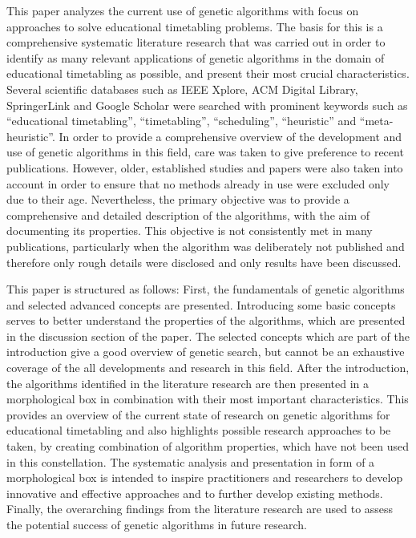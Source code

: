 \documentclass[sigconf]{acmart}
\begin{document}
This paper analyzes the current use of genetic algorithms with focus on
approaches to solve educational timetabling problems.
%
The basis for this is a comprehensive systematic literature research that
was carried out in order to identify as many relevant applications of genetic
algorithms in the domain of educational timetabling as possible, and
present their most crucial characteristics.
%
Several scientific databases such as IEEE Xplore, ACM Digital Library,
SpringerLink and Google Scholar were searched with prominent keywords such as
\enquote{educational timetabling}, \enquote{timetabling}, \enquote{scheduling},
\enquote{heuristic} and \enquote{meta-heuristic}.
%
In order to provide a comprehensive overview of the development and use of
genetic algorithms in this field, care was taken to give preference to recent
publications. However, older, established studies and papers were also taken
into account in order to ensure that no methods already in use were excluded
only due to their age.
%
Nevertheless, the primary objective was to provide a comprehensive and detailed
description of the algorithms, with the aim of documenting its properties.
This objective is not consistently met in many publications, particularly
when the algorithm was deliberately not published and therefore only rough
details were disclosed and only results have been discussed.


This paper is structured as follows:
First, the fundamentals of genetic algorithms and selected advanced concepts
are presented. Introducing some basic concepts serves to better understand the
properties of the algorithms, which are presented in the discussion section
of the paper. The selected concepts which are part of the introduction give
a good overview of genetic search, but cannot be an exhaustive coverage of the
all developments and research in this field.
%
After the introduction, the algorithms identified in the literature research
are then presented in a morphological box in combination with their most
important characteristics.
This provides an overview of the current state of research on genetic algorithms
for educational timetabling and also highlights possible research approaches
to be taken, by creating combination of algorithm properties, which have not
been used in this constellation.
The systematic analysis and presentation in form of a morphological box is
intended to inspire practitioners and researchers to develop innovative
and effective approaches and to further develop existing methods.
%
Finally, the overarching findings from the literature research are used to
assess the potential success of genetic algorithms in future research.
\end{document}
